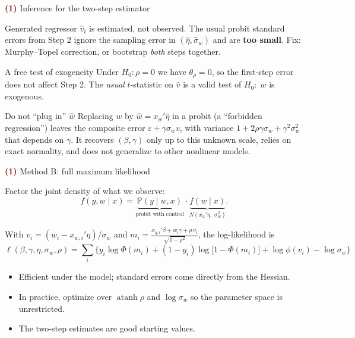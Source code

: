 \documentclass[aspectratio=169,11pt]{beamer}
\newcommand{\Pp}{\mathbb{P}}
\newcommand{\Part}[1]{\textcolor{DarkRed}{\textbf{(#1)}}}
\begin{document}
\begin{frame}{\Part{1} Inference for the two-step estimator}

\begin{block}{Generated regressor}
$\hat v_i$ is estimated, not observed. The usual probit standard errors
from Step 2 ignore the sampling error in $(\hat\eta,\hat\sigma_w)$ and are
\textbf{too small}.
Fix: Murphy--Topel correction, or bootstrap \emph{both} steps together.
\end{block}

\pause

\begin{block}{A free test of exogeneity}
Under $H_0:\rho=0$ we have $\theta_\rho=0$, so the first-step error
does not affect Step 2. The \emph{usual} $t$-statistic on $\hat v$ is a
valid test of $H_0:\; w$ is exogenous.
\end{block}

\pause

\begin{alertblock}{Do not ``plug in'' $\hat w$}
Replacing $w$ by $\hat w = x_w'\hat\eta$ in a probit (a ``forbidden
regression'') leaves the composite error $\varepsilon+\gamma\sigma_w v$,
with variance $1+2\rho\gamma\sigma_w+\gamma^2\sigma_w^2$ that depends on
$\gamma$. It recovers $(\beta,\gamma)$ only up to this unknown scale, relies on
exact normality, and does not generalize to other nonlinear models.
\end{alertblock}

\end{frame}

\begin{frame}{\Part{1} Method B: full maximum likelihood}

Factor the joint density of what we observe:
\[
f(y,w\mid x)
=\underbrace{\Pp(y\mid w,x)}_{\text{probit with control}}
\cdot
\underbrace{f(w\mid x)}_{N(x_w'\eta,\;\sigma_w^2)} .
\]

\pause

With $v_i=(w_i-x_{w,i}'\eta)/\sigma_w$ and
$\displaystyle m_i=\frac{x_{y,i}'\beta + w_i\gamma + \rho\,v_i}{\sqrt{1-\rho^2}}$,
the log-likelihood is
\[
\boxed{
\ell(\beta,\gamma,\eta,\sigma_w,\rho)
=\sum_i\Big\{
y_i\log\Phi(m_i)+(1-y_i)\log\big[1-\Phi(m_i)\big]
+\log\phi(v_i)-\log\sigma_w
\Big\}}
\]

\pause

\begin{itemize}
  \item Efficient under the model; standard errors come directly from the Hessian.
  \item In practice, optimize over $\operatorname{atanh}\rho$ and $\log\sigma_w$ so the parameter space is unrestricted.
  \item The two-step estimates are good starting values.
\end{itemize}

\end{frame}
\end{document}
